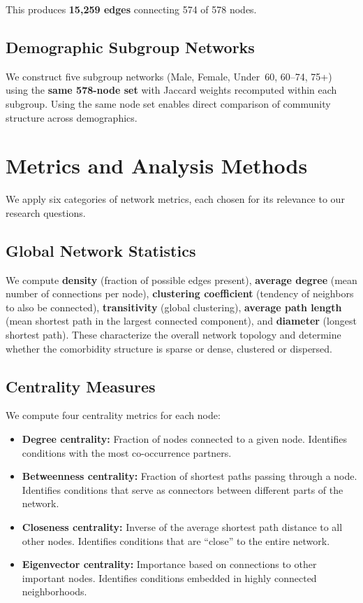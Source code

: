 \documentclass[10pt,twocolumn]{article}
\begin{document}
This produces \textbf{15,259 edges} connecting 574 of 578 nodes.

\subsection{Demographic Subgroup Networks}

We construct five subgroup networks (Male, Female, Under~60, 60--74, 75+) using the \textbf{same 578-node set} with Jaccard weights recomputed within each subgroup.
Using the same node set enables direct comparison of community structure across demographics.


\section{Metrics and Analysis Methods}

We apply six categories of network metrics, each chosen for its relevance to our research questions.

\subsection{Global Network Statistics}

We compute \textbf{density} (fraction of possible edges present), \textbf{average degree} (mean number of connections per node), \textbf{clustering coefficient} (tendency of neighbors to also be connected), \textbf{transitivity} (global clustering), \textbf{average path length} (mean shortest path in the largest connected component), and \textbf{diameter} (longest shortest path).
These characterize the overall network topology and determine whether the comorbidity structure is sparse or dense, clustered or dispersed.

\subsection{Centrality Measures}

We compute four centrality metrics for each node:

\begin{itemize}
    \item \textbf{Degree centrality:} Fraction of nodes connected to a given node. Identifies conditions with the most co-occurrence partners.
    \item \textbf{Betweenness centrality:} Fraction of shortest paths passing through a node. Identifies conditions that serve as connectors between different parts of the network.
    \item \textbf{Closeness centrality:} Inverse of the average shortest path distance to all other nodes. Identifies conditions that are ``close'' to the entire network.
    \item \textbf{Eigenvector centrality:} Importance based on connections to other important nodes. Identifies conditions embedded in highly connected neighborhoods.
\end{itemize}
\end{document}
